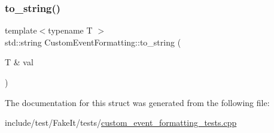 \mbox{\label{structCustomEventFormatting_ab3e7573bccfb45e91fe3da4d5ab5953e}} 
\subsubsection{\texorpdfstring{to\_string()}{to\_string()}}
{\footnotesize\ttfamily template$<$typename T $>$ \\
std\+::string Custom\+Event\+Formatting\+::to\+\_\+string (\begin{DoxyParamCaption}\item[{T \&}]{val }\end{DoxyParamCaption})\hspace{0.3cm}{\ttfamily [inline]}}



The documentation for this struct was generated from the following file\+:\begin{DoxyCompactItemize}
\item 
include/test/\+Fake\+It/tests/\mbox{\hyperlink{custom__event__formatting__tests_8cpp}{custom\+\_\+event\+\_\+formatting\+\_\+tests.\+cpp}}\end{DoxyCompactItemize}
